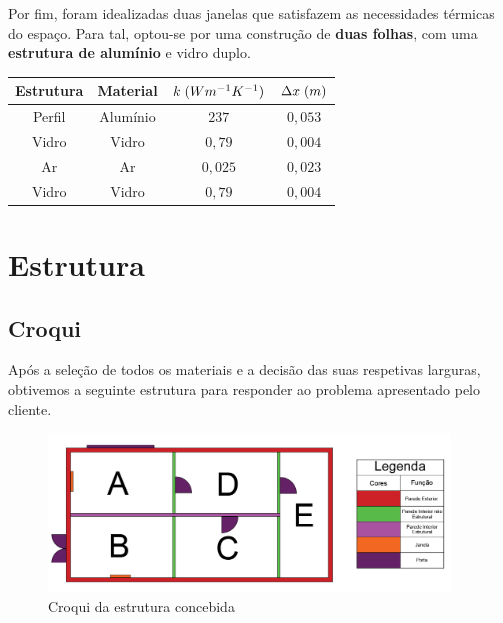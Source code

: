 \documentclass[12pt, a4paper]{article}
\begin{document}
Por fim, foram idealizadas duas janelas que satisfazem as necessidades térmicas do espaço.
Para tal, optou-se por uma construção de \textbf{duas folhas}, com uma \textbf{estrutura de alumínio} e
vidro duplo.
\begin{center}
	\begin{tabular}{||c c c c||}
		\hline
		Estrutura & Material & $k \hspace{1mm} (Wm^{-1}K^{-1})$ & $\Delta x \hspace{1mm} (m)$ \\ [0.5ex]
		\hline\hline
		Perfil    & Alumínio & $237$                            & $0,053$                     \\
		\hline
		Vidro     & Vidro    & $0,79$                           & $0,004$                     \\
		\hline
		Ar        & Ar       & $0,025$                          & $0,023$                     \\
		\hline
		Vidro     & Vidro    & $0,79$                           & $0,004$                     \\
		\hline
	\end{tabular}
\end{center}






\section{Estrutura}\label{sec:Estrutura}


\subsection{Croqui}\label{sub:croqui}

Ap\'os a sele\c{c}\~ao de todos os materiais e a decis\~ao das suas respetivas larguras,
obtivemos a seguinte estrutura para responder ao problema apresentado pelo cliente.

\begin{figure}[htpb]
    \begin{center}
        \includegraphics[width=0.95\textwidth]{img/sketch3.png}
    \end{center}
    \caption{Croqui da estrutura concebida}\label{fig:croqui}
\end{figure}
\end{document}
